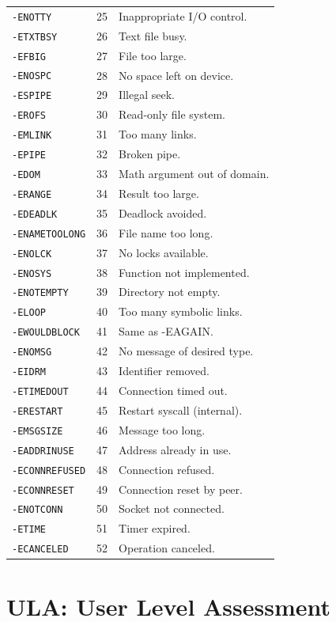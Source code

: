 \documentclass[12pt,a4paper]{article}
\begin{document}
\begin{longtable}{|l|l|p{}|}
\verb|-ENOTTY| & 25 & Inappropriate I/O control. \\
\verb|-ETXTBSY| & 26 & Text file busy. \\
\verb|-EFBIG| & 27 & File too large. \\
\verb|-ENOSPC| & 28 & No space left on device. \\
\verb|-ESPIPE| & 29 & Illegal seek. \\
\verb|-EROFS| & 30 & Read-only file system. \\
\verb|-EMLINK| & 31 & Too many links. \\
\verb|-EPIPE| & 32 & Broken pipe. \\
\verb|-EDOM| & 33 & Math argument out of domain. \\
\verb|-ERANGE| & 34 & Result too large. \\
\verb|-EDEADLK| & 35 & Deadlock avoided. \\
\verb|-ENAMETOOLONG| & 36 & File name too long. \\
\verb|-ENOLCK| & 37 & No locks available. \\
\verb|-ENOSYS| & 38 & Function not implemented. \\
\verb|-ENOTEMPTY| & 39 & Directory not empty. \\
\verb|-ELOOP| & 40 & Too many symbolic links. \\
\verb|-EWOULDBLOCK| & 41 & Same as -EAGAIN. \\
\verb|-ENOMSG| & 42 & No message of desired type. \\
\verb|-EIDRM| & 43 & Identifier removed. \\
\verb|-ETIMEDOUT| & 44 & Connection timed out. \\
\verb|-ERESTART| & 45 & Restart syscall (internal). \\
\verb|-EMSGSIZE| & 46 & Message too long. \\
\verb|-EADDRINUSE| & 47 & Address already in use. \\
\verb|-ECONNREFUSED| & 48 & Connection refused. \\
\verb|-ECONNRESET| & 49 & Connection reset by peer. \\
\verb|-ENOTCONN| & 50 & Socket not connected. \\
\verb|-ETIME| & 51 & Timer expired. \\
\verb|-ECANCELED| & 52 & Operation canceled. \\
\hline
\end{longtable}

\appendix

\section{ULA: User Level Assessment}
\label{app:ula}
\end{document}
